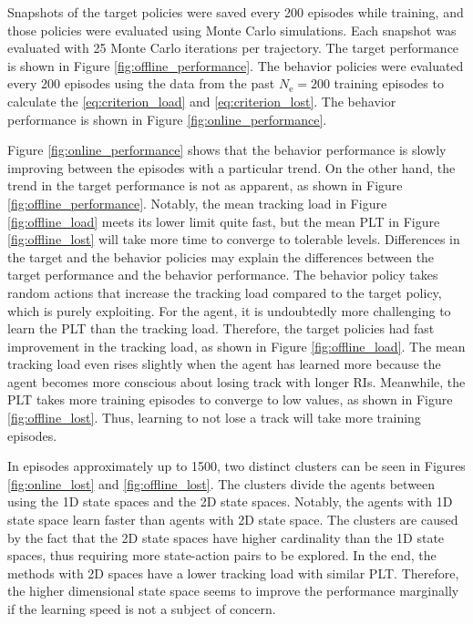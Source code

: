 \documentclass[english, 12pt, a4paper, elec, utf8, a-1b, online]{aaltothesis}
\newcommand{\Ne}{N_\text{e}}
\begin{document}
Snapshots of the target policies were saved every 200 episodes while training, and those policies were evaluated using Monte Carlo simulations.
Each snapshot was evaluated with 25 Monte Carlo iterations per trajectory.
The target performance is shown in Figure \ref{fig:offline_performance}.
The behavior policies were evaluated every 200 episodes using the data from the past $\Ne=200$ training episodes to calculate the \eqref{eq:criterion_load} and \eqref{eq:criterion_lost}.
The behavior performance is shown in Figure \ref{fig:online_performance}.

Figure \ref{fig:online_performance} shows that the behavior performance is slowly improving between the episodes with a particular trend.
On the other hand, the trend in the target performance is not as apparent, as shown in Figure \ref{fig:offline_performance}.
Notably, the mean tracking load in Figure \ref{fig:offline_load} meets its lower limit quite fast, but the mean PLT in Figure \ref{fig:offline_lost} will take more time to converge to tolerable levels.
Differences in the target and the behavior policies may explain the differences between the target performance and the behavior performance.
The behavior policy takes random actions that increase the tracking load compared to the target policy, which is purely exploiting.
For the agent, it is undoubtedly more challenging to learn the PLT than the tracking load.
Therefore, the target policies had fast improvement in the tracking load, as shown in Figure \ref{fig:offline_load}. 
The mean tracking load even rises slightly when the agent has learned more because the agent becomes more conscious about losing track with longer RIs.
Meanwhile, the PLT takes more training episodes to converge to low values, as shown in Figure \ref{fig:offline_lost}.
Thus, learning to not lose a track will take more training episodes.


In episodes approximately up to 1500, two distinct clusters can be seen in Figures \ref{fig:online_lost} and \ref{fig:offline_lost}.
The clusters divide the agents between using the 1D state spaces and the 2D state spaces.
Notably, the agents with 1D state space learn faster than agents with 2D state space.
The clusters are caused by the fact that the 2D state spaces have higher cardinality than the 1D state spaces, thus requiring more state-action pairs to be explored.
In the end, the methods with 2D spaces have a lower tracking load with similar PLT.
Therefore, the higher dimensional state space seems to improve the performance marginally if the learning speed is not a subject of concern.
\end{document}
